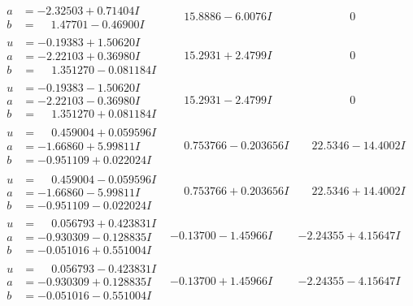 \documentclass[1p]{elsarticle_modified}
\theoremstyle{definition}
\begin{document}
$$\begin{array}{c|c|c}
\begin{aligned}
a &= -2.32503 + 0.71404 I \\
b &= \phantom{-}1.47701 - 0.46900 I\end{aligned}
 & \phantom{-}15.8886 - 6.0076 I & \phantom{-0.000000 } 0 \\ \hline\begin{aligned}
u &= -0.19383 + 1.50620 I \\
a &= -2.22103 + 0.36980 I \\
b &= \phantom{-}1.351270 - 0.081184 I\end{aligned}
 & \phantom{-}15.2931 + 2.4799 I & \phantom{-0.000000 } 0 \\ \hline\begin{aligned}
u &= -0.19383 - 1.50620 I \\
a &= -2.22103 - 0.36980 I \\
b &= \phantom{-}1.351270 + 0.081184 I\end{aligned}
 & \phantom{-}15.2931 - 2.4799 I & \phantom{-0.000000 } 0 \\ \hline\begin{aligned}
u &= \phantom{-}0.459004 + 0.059596 I \\
a &= -1.66860 + 5.99811 I \\
b &= -0.951109 + 0.022024 I\end{aligned}
 & \phantom{-}0.753766 - 0.203656 I & \phantom{-}22.5346 - 14.4002 I \\ \hline\begin{aligned}
u &= \phantom{-}0.459004 - 0.059596 I \\
a &= -1.66860 - 5.99811 I \\
b &= -0.951109 - 0.022024 I\end{aligned}
 & \phantom{-}0.753766 + 0.203656 I & \phantom{-}22.5346 + 14.4002 I \\ \hline\begin{aligned}
u &= \phantom{-}0.056793 + 0.423831 I \\
a &= -0.930309 - 0.128835 I \\
b &= -0.051016 + 0.551004 I\end{aligned}
 & -0.13700 - 1.45966 I & -2.24355 + 4.15647 I \\ \hline\begin{aligned}
u &= \phantom{-}0.056793 - 0.423831 I \\
a &= -0.930309 + 0.128835 I \\
b &= -0.051016 - 0.551004 I\end{aligned}
 & -0.13700 + 1.45966 I & -2.24355 - 4.15647 I \\ \hline\begin{aligned}

\end{aligned}
\end{array}$$
\end{document}
